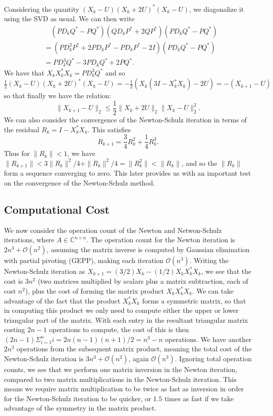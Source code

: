 \documentclass[12pt]{article}
\def\C{\mathbb{C}}
\def\nbyn{n \times n}
\def\norm#1{\|#1\|}
\begin{document}
Considering the quantity $(X_k - U)(X_k+2U)^*(X_k-U)$, we diagonalize it using
the SVD as usual. We can then write
\begin{align*}
  &\quad(PD_kQ^* - PQ^*)(QD_kP^* + 2QP^*)(PD_kQ^* - PQ^*)\\
  & = (PD_k^2P^* + 2PD_kP^* - PD_kP^* - 2I)(PD_kQ^* - PQ^*)\\
  & = PD_k^3Q^* - 3PD_kQ^* + 2PQ^*\text{.}
\end{align*}
We have that $X_kX_k^*X_k = PD_k^3Q^*$ and so
\begin{math}
  \frac{1}{2}(X_k - U)(X_k+2U)^*(X_k-U) = -\frac{1}{2}(X_k(3I-X_k^*X_k) - 2U) = -(X_{k+1}-U)
\end{math}
so that finally we have the relation:
\begin{equation}
  \norm{X_{k+1}-U}_2 \leq \frac{1}{2}
  \norm{X_k+2U}_2\norm{X_k - U}_2^2\text{.}
\end{equation}
We can also consider the convergence of the Newton-Schulz iteration in
terms of the residual $R_k = I-X_k^*X_k$. This satisfies \cite{Higham:2008:FM}
\begin{equation*}
  R_{k+1} = \frac{3}{4}R_k^2 + \frac{1}{4}R_k^3\text{.}
\end{equation*}
Thus for $\norm{R_k} < 1$, we have
$\norm{R_{k+1}} < 3\norm{R_k}^2/4 + \norm{R_k}^2/4 = \norm{R_k^2} < \norm{R_k}$,
and so the $\|R_k\|$ form a sequence converging to zero. This later provides us
with an important test on the convergence of the Newton-Schulz method.

\subsection{Computational Cost}
We now consider the operation count of the Newton and Netwon-Schulz iterations,
where $A \in \C^{\nbyn}$. The operation count for the Newton iteration is
$2n^3 + \mathcal{O}(n^2)$, assuming the matrix inverse is computed by Gaussian
elimination with partial pivoting (GEPP), making each iteration
$\mathcal{O}(n^3)$. Writing the Newton-Schulz iteration as
$X_{k+1} = (3/2)X_k - (1/2)X_kX_k^*X_k$, we see that the cost is $3n^2$ (two
matrices multiplied by scalars plus a matrix subtraction, each of cost $n^2$),
plus the cost of forming the matrix product $X_kX_k^*X_k$. We can take
advantage of the fact that the product $X_k^*X_k$ forms a symmetric matrix, so
that in computing this product we only need to compute either the upper or lower
triangular part of the matrix. With each entry in the resultant triangular
matrix costing $2n-1$ operations to compute, the cost of this is then
$(2n-1)\Sigma_{i=1}^n i = 2n(n-1)(n+1)/2 = n^3 - n$ operations. We have another
$2n^3$ operations from the subsequent matrix product, meaning the total cost of
the Newton-Schulz iteration is $3n^3 + \mathcal{O}(n^2)$, again
$\mathcal{O}(n^3)$. Ignoring total operation counts, we see that we perform one
matrix inversion in the Newton iteration, compared to two matrix multiplications
in the Newton-Schulz iteration. This means we require matrix multiplication to
be twice as fast as inversion in order for the Newton-Schulz iteration to be
quicker, or $1.5$ times as fast if we take advantage of the symmetry in the
matrix product.
\end{document}
